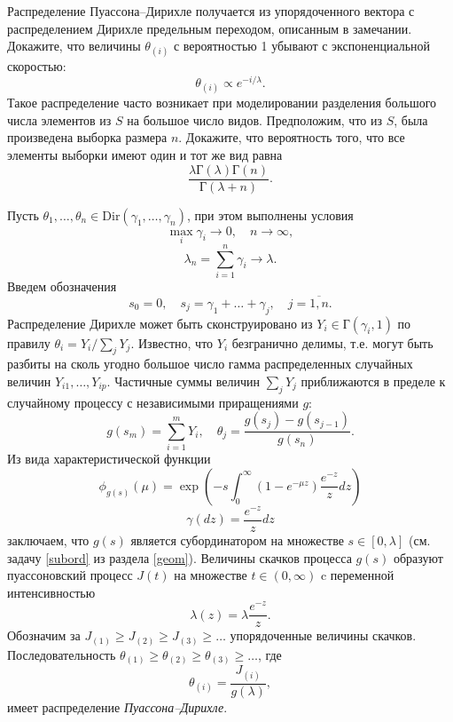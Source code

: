 \begin{problem} 
\label{po_dir}
Распределение Пуассона--Дирихле получается из упорядоченного вектора с распределением Дирихле предельным переходом, описанным в замечании. Докажите, что величины $\theta_{(i)}$ с вероятностью 1 убывают с экспоненциальной скоростью:
\[
\theta_{(i)} \propto e^{- i/\lambda}.
\]
Такое распределение часто возникает при моделировании разделения большого числа элементов из $S$ на большое число видов. Предположим, что из $S$, была произведена выборка размера $n$. Докажите, что вероятность того, что все элементы выборки имеют один и тот же вид равна
\[
\frac{\lambda \text{Г}(\lambda) \text{Г}(n) }{\text{Г}(\lambda+n)}.
\]
\end{problem}

\begin{remark}
Пусть $\theta_1,\ldots,\theta_n \in \mathrm{Dir}(\gamma_1,\ldots,\gamma_n)$, при этом
выполнены условия
\[
\max_i\gamma_i \to 0,
\quad n \to \infty,
\] 
\[
\lambda_n = \sum_{i=1}^n \gamma_i \to \lambda. 
\]
Введем обозначения
\[
s_0 = 0, \quad s_j = \gamma_1 + \ldots + \gamma_j, \quad j = \overline{1,n}.
\]
Распределение Дирихле может быть сконструировано из $Y_i \in \text{Г}(\gamma_i, 1)$ по правилу $\theta_i = Y_i/\sum_j Y_j$. Известно, что $Y_i$ безгранично делимы, т.е. могут быть разбиты на сколь угодно большое число гамма распределенных случайных величин $Y_{i1},\ldots,Y_{ip}$. Частичные суммы величин $\sum_j Y_j$ приближаются в пределе к случайному процессу с независимыми приращениями $g$: 
\[
g(s_m) = \sum_{i=1}^{m} Y_i, \quad \theta_j = \frac{g(s_j) - g(s_{j-1})}{g(s_n)}. 
\]       
Из вида характеристической функции 
\[
\phi_{g(s)}(\mu) = \exp \left(  
-s \int_{0}^{\infty} \left(1 - e^{-\mu z} \right) \frac{e^{-z}}{z} dz
\right)
\]
\[
\gamma(dz) = \frac{e^{-z}}{z} dz
\]
заключаем, что $g(s)$ является субординатором на множестве $s \in [0, \lambda]$ (см. задачу \ref{subord} из раздела \ref{geom}). Величины скачков процесса $g(s)$ образуют пуассоновский процесс $J(t)$ на множестве $t \in (0, \infty)$ c переменной интенсивностью
\[
\lambda(z) = \lambda \frac{e^{-z}}{z}.
\]   
Обозначим за $J_{(1)} \geq J_{(2)} \geq J_{(3)} \geq \ldots$ упорядоченные величины скачков. Последовательность $\theta_{(1)} \geq \theta_{(2)} \geq \theta_{(3)} \geq \ldots$, где 
\[
\theta_{(i)}  = \frac{J_{(i)}}{g(\lambda)},
\]
имеет распределение \textit{Пуассона--Дирихле}.

\end{remark}

